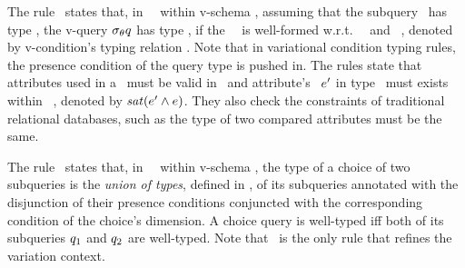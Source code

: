 %
The rule \selE\ states that, in \vctxTxt\ \vctx\ within v-schema \vSch, assuming 
that the subquery \vQ\ has type {\envInContext [\VVal \vctx] \vType}, 
the v-query $\sigma_{\vCond} \vQ$
has type {\envInContext [\VVal \vctx] \vType},
if the \vCondTxt\ \vCond\ is well-formed w.r.t.
 \vctxTxt\ \vctx\ and \tenvTxt\ {\envInContext [\VVal \vctx] \vType}, 
denoted by v-condition's typing relation 
\envCondAnnot \vCond.
Note that in variational condition typing rules, 
the presence condition of the query type is pushed in.
The rules state that attributes used in a
\vCondTxt\ must be valid in \vType\ and 
attribute's \presCondTxt\ \ensuremath {\VVal \dimMeta} 
in type \vType\ must exists within \vctxTxt\ \vctx,
denoted by \ensuremath{\sat {\VVal \dimMeta \wedge \vctx}}.
They also
check the constraints of traditional relational databases, such as the type of two 
compared attributes must be the same.

%
The rule \choiceE\ states that, in \vctxTxt\ \vctx\ within v-schema \vSch, the type of 
a choice of two subqueries is the \emph{union of types}, defined in 
, of its subqueries annotated with the disjunction of their presence
conditions conjuncted with the corresponding condition of the choice's dimension.
A choice query is well-typed iff both of 
its subqueries $\vQ_1$ and $\vQ_2$ are well-typed.
Note that \choiceE\ is the only rule that refines the variation context. 


